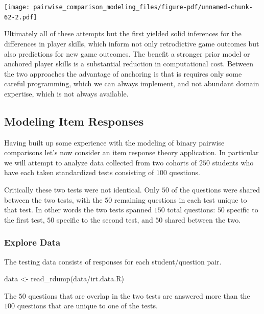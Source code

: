 \documentclass[
  letterpaper,
  DIV=11,
  numbers=noendperiod]{scrartcl}
\newenvironment{Shaded}{\begin{snugshade}}{\end{snugshade}}
\newcommand{\FunctionTok}[1]{\textcolor[rgb]{0.28,0.35,0.67}{#1}}
\newcommand{\NormalTok}[1]{\textcolor[rgb]{0.00,0.23,0.31}{#1}}
\newcommand{\OtherTok}[1]{\textcolor[rgb]{0.00,0.23,0.31}{#1}}
\newcommand{\StringTok}[1]{\textcolor[rgb]{0.13,0.47,0.30}{#1}}
\begin{document}
\texttt{[image: pairwise\_comparison\_modeling\_files/figure-pdf/unnamed-chunk-62-2.pdf]}

Ultimately all of these attempts but the first yielded solid inferences
for the differences in player skills, which inform not only retrodictive
game outcomes but also predictions for new game outcomes. The benefit a
stronger prior model or anchored player skills is a substantial
reduction in computational cost. Between the two approaches the
advantage of anchoring is that is requires only some careful
programming, which we can always implement, and not abundant domain
expertise, which is not always available.

\subsection{Modeling Item Responses}\label{sec:demo-irt}

Having built up some experience with the modeling of binary pairwise
comparisons let's now consider an item response theory application. In
particular we will attempt to analyze data collected from two cohorts of
\(250\) students who have each taken standardized tests consisting of
\(100\) questions.

Critically these two tests were not identical. Only \(50\) of the
questions were shared between the two tests, with the \(50\) remaining
questions in each test unique to that test. In other words the two tests
spanned \(150\) total questions: \(50\) specific to the first test,
\(50\) specific to the second test, and \(50\) shared between the two.

\subsubsection{Explore Data}\label{sec:irt-data-expl}

The testing data consists of responses for each student/question pair.

\begin{Shaded}
\begin{Highlighting}[]
\NormalTok{data }\OtherTok{\textless{}{-}} \FunctionTok{read\_rdump}\NormalTok{(}\StringTok{\textquotesingle{}data/irt.data.R\textquotesingle{}}\NormalTok{)}
\end{Highlighting}
\end{Shaded}

The \(50\) questions that are overlap in the two tests are answered more
than the \(100\) questions that are unique to one of the tests.
\end{document}
